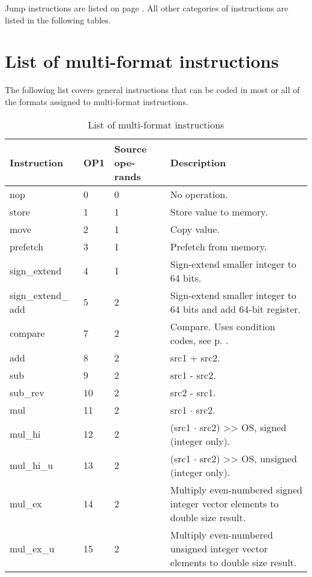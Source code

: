 \documentclass[forwardcom.tex]{subfiles}
\begin{document}
Jump instructions are listed on page \pageref{table:controlTransferInstructions}. All other categories of instructions are listed in the following tables.


\section{List of multi-format instructions}
The following list covers general instructions that can be coded in most or all of the formats
assigned to multi-format instructions.

\begin{longtable} {|p{25mm}|p{12mm}|p{12mm}|p{100mm}|}
\caption{
List of multi-format instructions} 
\label{table:ListOfMultiFormatInstructions} \\
\endfirsthead
\endhead
\hline
\bfseries Instruction & \bfseries OP1 & \bfseries Source ope-rands & \bfseries Description \\
\hline
nop          &  0 & 0 & No operation. \\
store        &  1 & 1 & Store value to memory. \\
move         &  2 & 1 & Copy value. \\
prefetch     &  3 & 1 & Prefetch from memory. \\
sign\_extend &  4 & 1 & Sign-extend smaller integer to 64 bits. \\
sign\_extend\_ add & 5 & 2 & Sign-extend smaller integer to 64 bits and add 64-bit register. \\
compare      &  7 & 2 & Compare. Uses condition codes, see p. \pageref{table:conditionCodesForCompareInstruction}. \\
add          &  8 & 2 & src1 + src2. \\
sub          &  9 & 2 & src1 - src2. \\
sub\_rev     & 10 & 2 & src2 - src1. \\
mul          & 11 & 2 & src1 $\cdot$ src2. \\ 
mul\_hi      & 12 & 2 & (src1 $\cdot$ src2) \textgreater\textgreater{} OS, signed (integer only). \\
mul\_hi\_u   & 13 & 2 & (src1 $\cdot$ src2) \textgreater\textgreater{}  OS, unsigned (integer only). \\
mul\_ex      & 14 & 2 & Multiply even-numbered signed integer vector elements to double size result. \\
mul\_ex\_u   & 15 & 2 & Multiply even-numbered unsigned integer vector elements to double size result. \\

\end{longtable}
\end{document}
